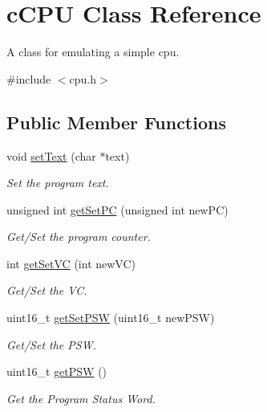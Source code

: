 \hypertarget{classcCPU}{\section{c\-C\-P\-U \-Class \-Reference}
\label{d2/dc6/classcCPU}
}


\-A class for emulating a simple cpu.  




{\ttfamily \#include $<$cpu.\-h$>$}

\subsection*{\-Public \-Member \-Functions}
\begin{DoxyCompactItemize}
\item 
void \hyperlink{classcCPU_acd957640be8abb7c0d8a24010ed0e737}{set\-Text} (char $\ast$text)
\begin{DoxyCompactList}\small\item\em \-Set the program text. \end{DoxyCompactList}\item 
unsigned int \hyperlink{classcCPU_ab04938ac939d530e521181db6a52944f}{get\-Set\-P\-C} (unsigned int new\-P\-C)
\begin{DoxyCompactList}\small\item\em \-Get/\-Set the program counter. \end{DoxyCompactList}\item 
int \hyperlink{classcCPU_a2d593a0d3d66e532826db4754d5fc4d2}{get\-Set\-V\-C} (int new\-V\-C)
\begin{DoxyCompactList}\small\item\em \-Get/\-Set the \-V\-C. \end{DoxyCompactList}\item 
uint16\-\_\-t \hyperlink{classcCPU_a0b13774a76c6b04d760b8ff072c37a85}{get\-Set\-P\-S\-W} (uint16\-\_\-t new\-P\-S\-W)
\begin{DoxyCompactList}\small\item\em \-Get/\-Set the \-P\-S\-W. \end{DoxyCompactList}\item 
uint16\-\_\-t \hyperlink{classcCPU_ad485374a709476e2dfb847046d3d5215}{get\-P\-S\-W} ()
\begin{DoxyCompactList}\small\item\em \-Get the \-Program \-Status \-Word. \end{DoxyCompactList}\item 

\end{DoxyCompactItemize}
